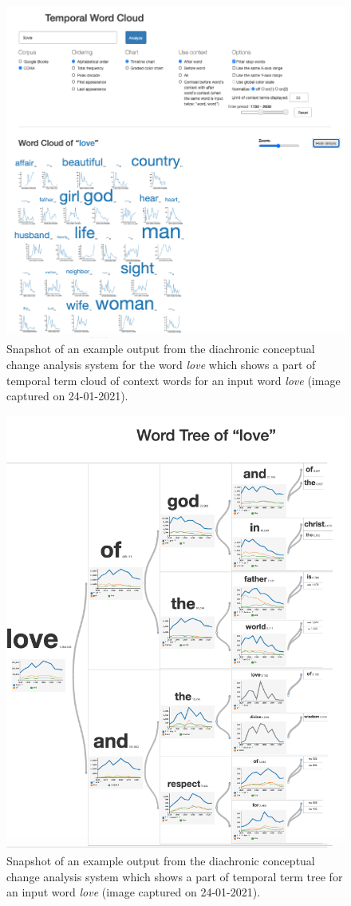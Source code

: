 \documentclass[output=paper%
]{langsci/langscibook}
\begin{document}
\begin{figure}
	\includegraphics[width=\textwidth]{figures/JATOWT_jatowt2.png}
        \caption{Snapshot of an example output from the diachronic conceptual change analysis system for the word \textit{love} which shows a part of temporal term cloud of context words for an input word \textit{love} (image captured on 24-01-2021).\label{fig:jatowt2}}
\end{figure}

\begin{figure}
	\includegraphics[width=.75\textwidth]{figures/JATOWT_jatowt3.png}
        \caption{Snapshot of an example output from the diachronic conceptual change analysis system which shows a part of temporal term tree for an input word \textit{love} (image captured on 24-01-2021).\label{fig:jatowt3}}
\end{figure}
\end{document}
